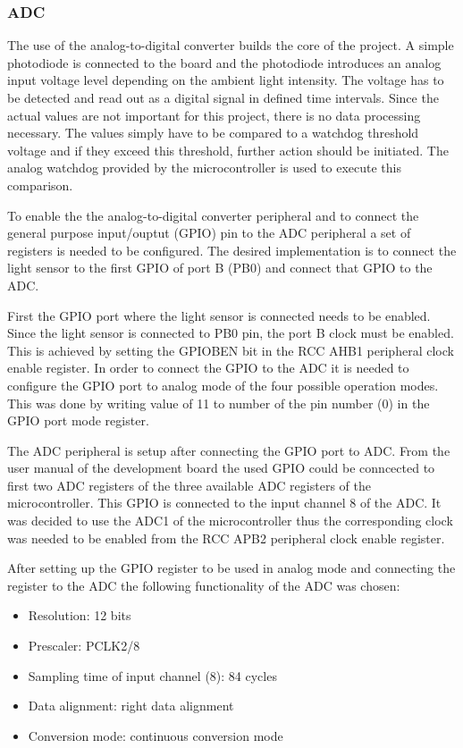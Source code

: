 \subsubsection{ADC}
The use of the analog-to-digital converter builds the core of the project. A simple photodiode is connected to the board and the photodiode introduces an analog input voltage level depending on the ambient light intensity. The voltage has to be detected and read out as a digital signal in defined time intervals. Since the actual values are not important for this project, there is no data processing necessary. The values simply have to be compared to a watchdog threshold voltage and if they exceed this threshold, further action should be initiated. The analog watchdog provided by the microcontroller is used to execute this comparison.\\
\par
To enable the the analog-to-digital converter peripheral and to connect the general purpose input/ouptut (GPIO) pin to the ADC peripheral a set of registers is needed to be configured. The desired implementation is to connect the light sensor to the first GPIO of port B (PB0) and connect that GPIO to the ADC.\\
\par
First the GPIO port where the light sensor is connected needs to be enabled. Since the light sensor is connected to PB0 pin, the port B clock must be enabled. This is achieved by setting the GPIOBEN bit in the RCC AHB1 peripheral clock enable register. In order to connect the GPIO to the ADC it is needed to configure the GPIO port to analog mode of the four possible operation modes. This was done by writing value of 11 to number of the pin number (0) in the GPIO port mode register.\\
\par
The ADC peripheral is setup after connecting the GPIO port to ADC. From the user manual of the development board \cite{UsrManual} the used GPIO could be conncected to first two ADC registers of the three available ADC registers of the microcontroller. This GPIO is connected to the input channel 8 of the ADC. It was decided to use the ADC1 of the microcontroller thus the corresponding clock was needed to be enabled from the RCC APB2 peripheral clock enable register.\\
\par
After setting up the GPIO register to be used in analog mode and connecting the register to the ADC the following functionality of the ADC was chosen:
\begin{itemize}
  \item Resolution: 12 bits
  \item Prescaler: PCLK2/8
  \item Sampling time of input channel (8): 84 cycles
  \item Data alignment: right data alignment
  \item Conversion mode: continuous conversion mode
\end{itemize}
